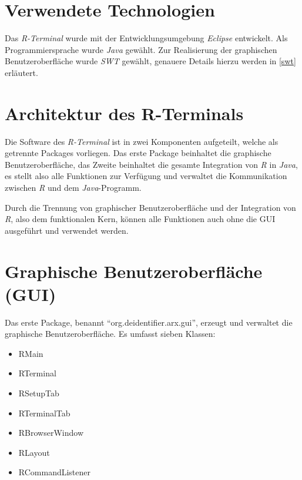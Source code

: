 \documentclass[a4paper, 12pt]{report} %
\begin{document}
\section{Verwendete Technologien}

Das \textit{R-Terminal} wurde mit der Entwicklungsumgebung \textit{Eclipse} entwickelt.
Als Programmiersprache wurde \textit{Java} gewählt. Zur Realisierung der graphischen Benutzeroberfläche wurde \textit{SWT} gewählt, genauere Details hierzu werden in \ref{swt} erläutert.



\section{Architektur des R-Terminals}

Die Software des \textit{R-Terminal} ist in zwei Komponenten aufgeteilt, welche als getrennte Packages vorliegen. Das erste Package beinhaltet die graphische Benutzeroberfläche, das Zweite beinhaltet die gesamte Integration von \textit{R} in \textit{Java}, es stellt also alle Funktionen zur Verfügung und verwaltet die Kommunikation zwischen \textit{R} und dem \textit{Java}-Programm.

Durch die Trennung von graphischer Benutzeroberfläche und der Integration von \textit{R}, also dem funktionalen Kern, können alle Funktionen auch ohne die GUI ausgeführt und verwendet werden.

\section{Graphische Benutzeroberfläche (GUI)}\label{gui}

\begin{samepage}

Das erste Package, benannt "`org.deidentifier.arx.gui"', erzeugt und verwaltet die graphische Benutzeroberfläche. Es umfasst sieben Klassen:
\begin{itemize}
	\item RMain
	\item RTerminal
	\item RSetupTab
	\item RTerminalTab
	\item RBrowserWindow
	\item RLayout
	\item RCommandListener
\end{itemize}
\end{samepage}
\end{document}
